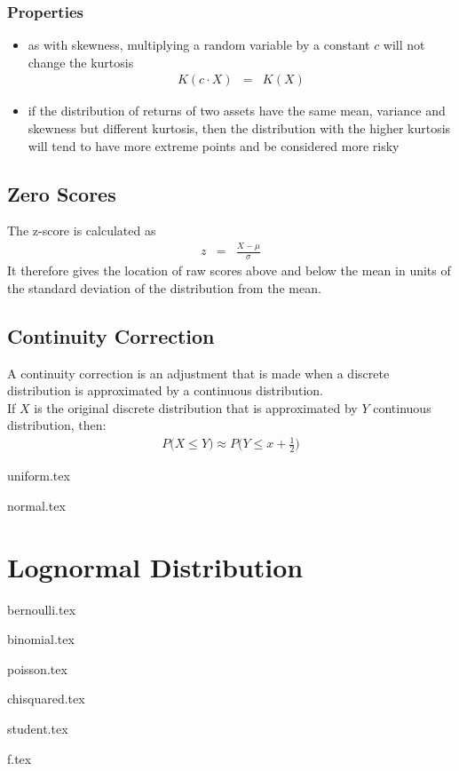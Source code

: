 \subsection{Properties}
\begin{itemize}
	\item as with skewness, multiplying a random variable by a constant $c$ will not change the kurtosis
	\begin{eqnarray}
		K(c\cdot X) &=& K(X)
	\end{eqnarray}
	\item if the distribution of returns of two assets have the same mean, variance and skewness but different kurtosis, then the distribution with the higher kurtosis will tend to have more extreme points and be considered more risky
\end{itemize}

\section{Zero Scores}
The z-score is calculated as
\begin{eqnarray}
	z &=& \frac{X - \mu}{\sigma}
\end{eqnarray}
It therefore gives the location of raw scores above and below the mean in units of the standard deviation of the distribution from the mean.


\section{Continuity Correction}
A continuity correction is an adjustment that is made when a discrete distribution is approximated by a continuous distribution.\\
If $X$ is the original discrete distribution that is approximated by $Y$ continuous distribution, then:
\begin{eqnarray}
	P\big(X \leq Y\big) \approx P\big(Y \leq x + \frac{1}{2}\big)
\end{eqnarray}

\pagebreak

{uniform.tex}
\pagebreak

{normal.tex}
\pagebreak

\chapter{Lognormal Distribution}
\pagebreak


{bernoulli.tex}
\pagebreak


{binomial.tex}


{poisson.tex}
\pagebreak


{chisquared.tex}
\pagebreak


{student.tex}
\pagebreak


{f.tex}
\pagebreak
